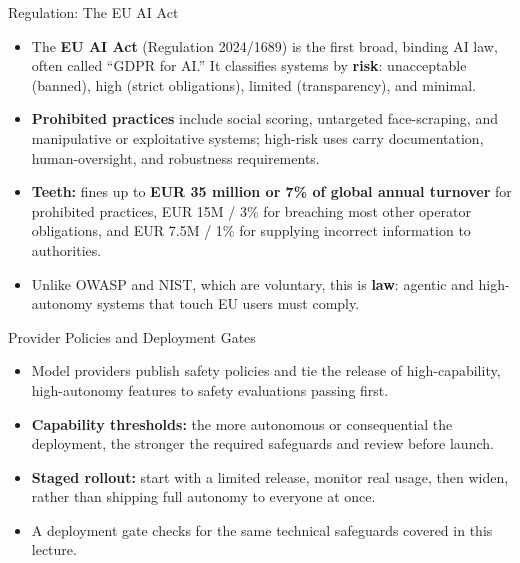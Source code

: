 \begin{frame}{Regulation: The EU AI Act}
  \begin{itemize}\itemsep0.5em
    \item[\textcolor{KAred}{$\blacktriangleright$}] The \textbf{EU AI Act} (Regulation 2024/1689) is the first broad, binding AI law, often called ``GDPR for AI.'' It classifies systems by \textbf{risk}: unacceptable (banned), high (strict obligations), limited (transparency), and minimal.
    \item[\textcolor{KAred}{$\blacktriangleright$}] \textbf{Prohibited practices} include social scoring, untargeted face-scraping, and manipulative or exploitative systems; high-risk uses carry documentation, human-oversight, and robustness requirements.
    \item[\textcolor{KAred}{$\blacktriangleright$}] \textbf{Teeth:} fines up to \textbf{EUR 35 million or 7\% of global annual turnover} for prohibited practices, EUR 15M / 3\% for breaching most other operator obligations, and EUR 7.5M / 1\% for supplying incorrect information to authorities.
    \item[\textcolor{KAred}{$\blacktriangleright$}] Unlike OWASP and NIST, which are voluntary, this is \textbf{law}: agentic and high-autonomy systems that touch EU users must comply.
  \end{itemize}
\end{frame}

\begin{frame}{Provider Policies and Deployment Gates}
  \begin{itemize}\itemsep0.5em
    \item[\textcolor{KAred}{$\blacktriangleright$}] Model providers publish safety policies and tie the release of high-capability, high-autonomy features to safety evaluations passing first.
    \item[\textcolor{KAred}{$\blacktriangleright$}] \textbf{Capability thresholds:} the more autonomous or consequential the deployment, the stronger the required safeguards and review before launch.
    \item[\textcolor{KAred}{$\blacktriangleright$}] \textbf{Staged rollout:} start with a limited release, monitor real usage, then widen, rather than shipping full autonomy to everyone at once.
    \item[\textcolor{KAred}{$\blacktriangleright$}] A deployment gate checks for the same technical safeguards covered in this lecture.
  \end{itemize}
\end{frame}


